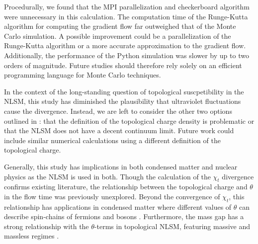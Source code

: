 Procedurally, we found that the MPI parallelization and checkerboard algorithm were unnecessary in this calculation. The computation time of the Runge-Kutta algorithm for computing the gradient flow far outweighed that of the Monte Carlo simulation. A possible improvement could be a parallelization of the Runge-Kutta algorithm or a more accurate approximation to the gradient flow. Additionally, the performance of the Python simulation was slower by up to two orders of magnitude. Future studies should therefore rely solely on an efficient programming language for Monte Carlo techniques.

In the context of the long-standing question of topological suscpetibility in the NLSM, this study has diminished the plausibility that ultraviolet fluctuations cause the divergence. Instead, we are left to consider the other two options outlined in \cite{berg1981}: that the definition of the topological charge density is problematic or that the NLSM does not have a decent continuum limit. Future work could include similar numerical calculations using a different definition of the topological charge.

Generally, this study has implications in both condensed matter and nuclear physics as the NLSM is used in both. Though the calculation of the $\chi_t$ divergence confirms existing literature, the relationship between the topological charge and $\theta$ in the flow time was previously unexplored. Beyond the convergence of $\chi_t$, this relationship has applications in condensed matter where different values of $\theta$ can describe spin-chains of fermions and bosons \cite{bogli2012}. Furthermore, the mass gap has a strong relationship with the $\theta$-terms in topological NLSM, featuring massive and massless regimes \cite{allessalom2008}.


